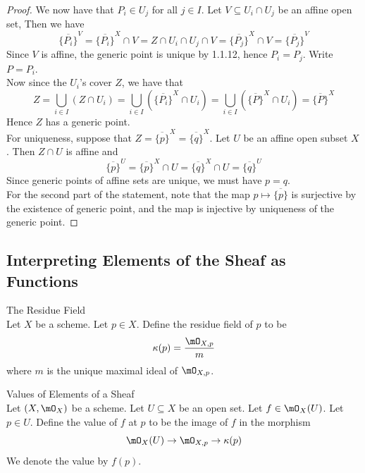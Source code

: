 \documentclass[a4paper]{article}
\begin{document}
\begin{lmm}{}{}
\begin{proof}
We now have that $P_i\in U_j$ for all $j\in I$. Let $V\subseteq U_i\cap U_j$ be an affine open set, Then we have $$\overline{\{P_i\}}^V=\overline{\{P_i\}}^X\cap V=Z\cap U_i\cap U_j\cap V=\overline{\{P_j\}}^X\cap V=\overline{\{P_j\}}^V$$ Since $V$ is affine, the generic point is unique by 1.1.12, hence $P_i=P_j$. Write $P=P_i$. \\

Now since the $U_i$'s cover $Z$, we have that $$Z=\bigcup_{i\in I}(Z\cap U_i)=\bigcup_{i\in I}(\overline{\{P_i\}}^X\cap U_i)=\bigcup_{i\in I}(\overline{\{P\}}^X\cap U_i)=\overline{\{P\}}^X$$ Hence $Z$ has a generic point. \\

For uniqueness, suppose that $Z=\overline{\{p\}}^X=\overline{\{q\}}^X$. Let $U$ be an affine open subset $X$. Then $Z\cap U$ is affine and $$\overline{\{p\}}^U=\overline{\{p\}}^X\cap U=\overline{\{q\}}^X\cap U=\overline{\{q\}}^U$$ Since generic points of affine sets are unique, we must have $p=q$. \\

For the second part of the statement, note that the map $p\mapsto\overline{\{p\}}$ is surjective by the existence of generic point, and the map is injective by uniqueness of the generic point. 
\end{proof}
\end{lmm}

\subsection{Interpreting Elements of the Sheaf as Functions}
\begin{defn}{The Residue Field}{}\\
Let $X$ be a scheme. Let $p\in X$. Define the residue field of $p$ to be $$\kappa(p)=\frac{\mO_{X,p}}{m}$$ where $m$ is the unique maximal ideal of $\mO_{X,p}$. 
\end{defn}

\begin{defn}{Values of Elements of a Sheaf}{}\\
Let $(X,\mO_X)$ be a scheme. Let $U\subseteq X$ be an open set. Let $f\in\mO_X(U)$. Let $p\in U$. Define the value of $f$ at $p$ to be the image of $f$ in the morphism $$\mO_X(U)\to\mO_{X,p}\to\kappa(p)$$ We denote the value by $f(p)$. 
\end{defn}
\end{document}

